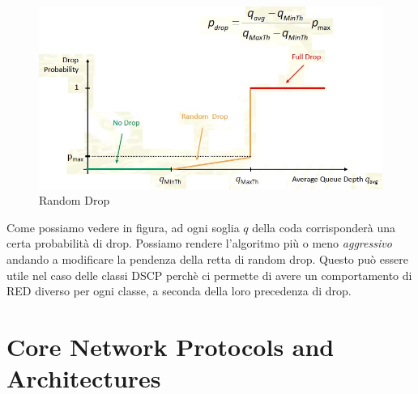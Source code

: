\documentclass{article}
\begin{document}
\begin{figure}[H]
    \centering
    \includegraphics[scale=0.5]{figures/red.jpg}
    \caption{Random Drop}
\end{figure}
Come possiamo vedere in figura, ad ogni soglia \(q\) della coda corrisponderà una certa probabilità di drop. Possiamo rendere l'algoritmo più o meno \textit{aggressivo} andando a modificare la pendenza della retta di random drop. Questo può essere utile nel caso delle classi DSCP perchè ci permette di avere un comportamento di RED diverso per ogni classe, a seconda della loro precedenza di drop.

\newpage
\section{Core Network Protocols and Architectures}
\end{document}

